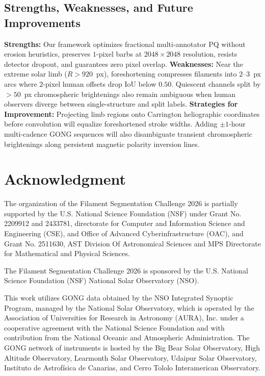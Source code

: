 \documentclass[sigconf]{acmart}
\begin{document}
\subsection{Strengths, Weaknesses, and Future Improvements}
\textbf{Strengths:} Our framework optimizes fractional multi-annotator $\mathrm{PQ}$ without erosion heuristics, preserves $1$-pixel barbs at $2048\times 2048$ resolution, resists detector dropout, and guarantees zero pixel overlap.
\textbf{Weaknesses:} Near the extreme solar limb ($R > 920$~px), foreshortening compresses filaments into $2$--$3$~px arcs where $2$-pixel human offsets drop $\mathrm{IoU}$ below $0.50$. Quiescent channels split by $>50$~px chromospheric brightenings also remain ambiguous when human observers diverge between single-structure and split labels.
\textbf{Strategies for Improvement:} Projecting limb regions onto Carrington heliographic coordinates before convolution will equalize foreshortened stroke widths. Adding $\pm 1$-hour multi-cadence GONG sequences will also disambiguate transient chromospheric brightenings along persistent magnetic polarity inversion lines.

\section{Acknowledgment}\label{sec:acknowledgment}
    The organization of the Filament Segmentation Challenge 2026 is partially supported by the U.S. National Science Foundation (NSF) under Grant No. 2209912 and 2433781, directorate for Computer and Information Science and Engineering (CSE), and Office of Advanced Cyberinfrastructure (OAC), and Grant No. 2511630, AST Division Of Astronomical Sciences and MPS Directorate for Mathematical and Physical Sciences.

    The Filament Segmentation Challenge 2026 is sponsored by the U.S. National Science Foundation (NSF) National Solar Observatory (NSO). 

    This work utilizes GONG data obtained by the NSO Integrated Synoptic Program, managed by the National Solar Observatory, which is operated by the Association of Universities for Research in Astronomy (AURA), Inc. under a cooperative agreement with the National Science Foundation and with contribution from the National Oceanic and Atmospheric Administration. The GONG network of instruments is hosted by the Big Bear Solar Observatory, High Altitude Observatory, Learmonth Solar Observatory, Udaipur Solar Observatory, Instituto de Astrofísica de Canarias, and Cerro Tololo Interamerican Observatory.



\end{document}
